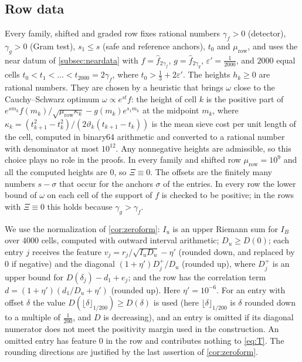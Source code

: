 \documentclass[11pt]{amsart}
\numberwithin{equation}{section}
\theoremstyle{plain}
\theoremstyle{definition}
\theoremstyle{remark}
\newcommand{\eps}{\varepsilon}
\newcommand{\1}{\mathbf{1}}
\begin{document}
\subsection{Row data}\label{subsec:rowdata}
Every family, shifted and graded row fixes rational numbers $\gamma_f>0$ (detector), $\gamma_g>0$ (Gram test),
$s_1\le s$ (safe and reference anchors), $t_0$ and $\mu_{\mathrm{row}}$, and uses the near datum of \cref{subsec:neardata} with
$f=\hat f_{2\gamma_f}$, $g=\hat f_{2\gamma_g}$, $\eps'=\frac1{2000}$, and $2000$ equal cells
$t_0<t_1<\dots<t_{2000}=2\gamma_f$, where $t_0>\frac13+2\eps'$. The heights $h_k\ge0$ are rational numbers.
They are chosen by a heuristic that brings $\omega$ close to the Cauchy--Schwarz optimum
$\omega\propto e^{st}f$: the height of cell $k$ is the positive part of
$e^{sm_k}f(m_k)/\sqrt{\mu_{\mathrm{row}}\kappa_k}-g(m_k)e^{s_1m_k}$ at the midpoint $m_k$, where
$\kappa_k=(t_{k+1}^2-t_k^2)/(2\vartheta_k(t_{k+1}-t_k))$ is the mean sieve cost per unit length of the cell,
computed in binary64 arithmetic and converted to a rational number with denominator at most
$10^{12}$. Any nonnegative heights are admissible, so this choice plays no role in the proofs. In
every family and shifted row $\mu_{\mathrm{row}}=10^9$ and all the computed heights are $0$, so $\Xi\equiv0$. The
offsets are the finitely many numbers $s-\sigma$ that occur for the anchors $\sigma$ of the entries. In
every row the lower bound of $\omega$ on each cell of the support of $f$ is checked to be positive; in
the rows with $\Xi\equiv0$ this holds because $\gamma_g>\gamma_f$.

We use the normalization of \cref{cor:zeroform}: $I_u$ is an upper Riemann
sum for $I_B$ over $4000$ cells, computed with outward interval arithmetic; $D_u\ge D(0)$; each entry
$j$ receives the feature $v_j=r_j/\sqrt{I_uD_u}-\eta'$ (rounded down, and replaced by $0$ if negative)
and the diagonal $(1+\eta')D_j^+/D_u$ (rounded up), where $D_j^+$ is an upper bound for
$D(\delta_j)-d_1+e_j$; and the row has the correlation term $d=(1+\eta')(d_1/D_u+\eta')$ (rounded up). Here
$\eta'=10^{-6}$. For an entry with offset $\delta$ the value $D(\lfloor\delta\rfloor_{1/200})\ge D(\delta)$ is used
(here $\lfloor\delta\rfloor_{1/200}$ is $\delta$ rounded down to a multiple of $\frac1{200}$, and $D$ is decreasing), and an
entry is omitted if its diagonal numerator does not meet the positivity margin used
in the construction. An omitted entry has feature $0$ in the row and contributes
nothing to \eqref{eq:T}. The rounding directions are justified by the last assertion of
\cref{cor:zeroform}.
\end{document}
